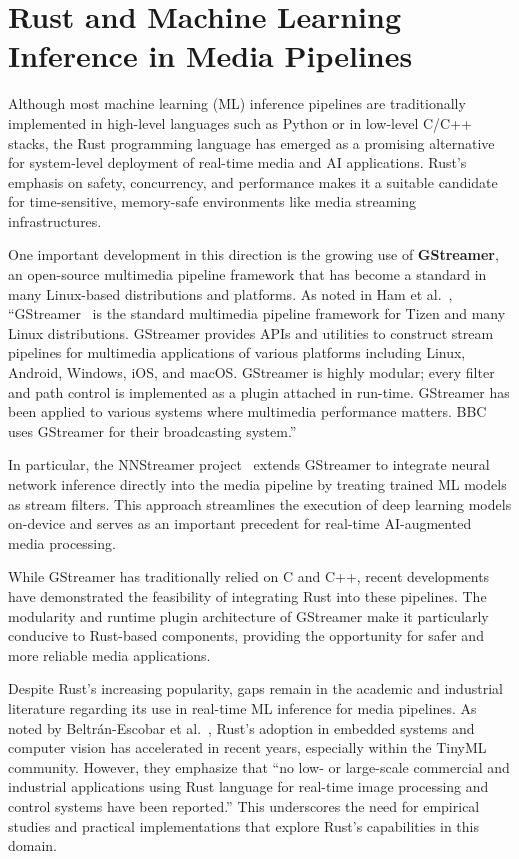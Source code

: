 \section{Rust and Machine Learning Inference in Media Pipelines}

Although most machine learning (ML) inference pipelines are traditionally implemented in high-level languages such as Python or in low-level C/C++ stacks, the Rust programming language has emerged as a promising alternative for system-level deployment of real-time media and AI applications. Rust's emphasis on safety, concurrency, and performance makes it a suitable candidate for time-sensitive, memory-safe environments like media streaming infrastructures.

One important development in this direction is the growing use of \textbf{GStreamer}, an open-source multimedia pipeline framework that has become a standard in many Linux-based distributions and platforms. As noted in Ham et al.~\cite{ham2019nnstreamer}, ``GStreamer~\cite{gstreamer1999} is the standard multimedia pipeline framework for Tizen and many Linux distributions. GStreamer provides APIs and utilities to construct stream pipelines for multimedia applications of various platforms including Linux, Android, Windows, iOS, and macOS. GStreamer is highly modular; every filter and path control is implemented as a plugin attached in run-time. GStreamer has been applied to various systems where multimedia performance matters. BBC uses GStreamer for their broadcasting system.''

In particular, the NNStreamer project~\cite{ham2019nnstreamer} extends GStreamer to integrate neural network inference directly into the media pipeline by treating trained ML models as stream filters. This approach streamlines the execution of deep learning models on-device and serves as an important precedent for real-time AI-augmented media processing.

While GStreamer has traditionally relied on C and C++, recent developments have demonstrated the feasibility of integrating Rust into these pipelines. The modularity and runtime plugin architecture of GStreamer make it particularly conducive to Rust-based components, providing the opportunity for safer and more reliable media applications.

Despite Rust’s increasing popularity, gaps remain in the academic and industrial literature regarding its use in real-time ML inference for media pipelines. As noted by Beltrán-Escobar et al.~\cite{beltran2024review}, Rust's adoption in embedded systems and computer vision has accelerated in recent years, especially within the TinyML community. However, they emphasize that “no low- or large-scale commercial and industrial applications using Rust language for real-time image processing and control systems have been reported.” This underscores the need for empirical studies and practical implementations that explore Rust’s capabilities in this domain.

